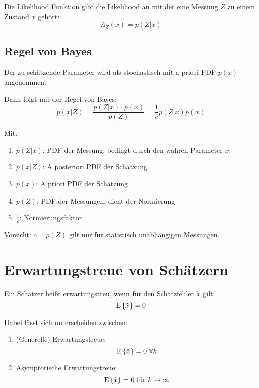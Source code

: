 Die Likelihood Funktion gibt die Likelihood an mit der eine Messung $Z$ zu einem Zustand $x$ gehört:
\begin{equation*}
    \Lambda_Z(x) = p(Z|x)
\end{equation*}

\subsection{Regel von Bayes}
Der zu schätzende Parameter wird als stochastisch mit a priori PDF $p(x)$ angenommen.

Dann folgt mit der Regel von Bayes:
\begin{equation*}
    p(x|Z) = \frac{p(Z|x) \cdot p(x)}{p(Z)} = \frac{1}{c} p(Z|x) p(x)
\end{equation*}

Mit:
\begin{enumerate}
    \item $p(Z|x)$: PDF der Messung, bedingt durch den wahren Parameter $x$.
    \item $p(x|Z)$: A posteriori PDF der Schätzung
    \item $p(x)$: A priori PDF der Schätzung
    \item $p(Z)$: PDF der Messungen, dient der Normierung
    \item $\frac{1}{c}$: Normierungsfaktor
\end{enumerate}

Vorsicht: $c = p(Z)$ gilt nur für statistisch unabhängigen Messungen.

\section{Erwartungstreue von Schätzern}
Ein Schätzer heißt erwartungstreu, wenn für den Schätzfehler $\tilde{x}$ gilt:
\begin{equation*}
    \operatorname*{E}\left\{\tilde{x}\right\} = 0
\end{equation*}

Dabei lässt sich unterscheiden zwischen:
\begin{enumerate}
    \item (Generelle) Erwartungstreue:
        \begin{equation*}
            \operatorname*{E}\left\{\tilde{x}\right\} = 0\ \forall k
        \end{equation*}
    \item Asymptotische Erwartungstreue:
        \begin{equation*}
            \operatorname*{E}\left\{\tilde{x}\right\} = 0\ \text{für } k \to \infty
        \end{equation*}
\end{enumerate}

